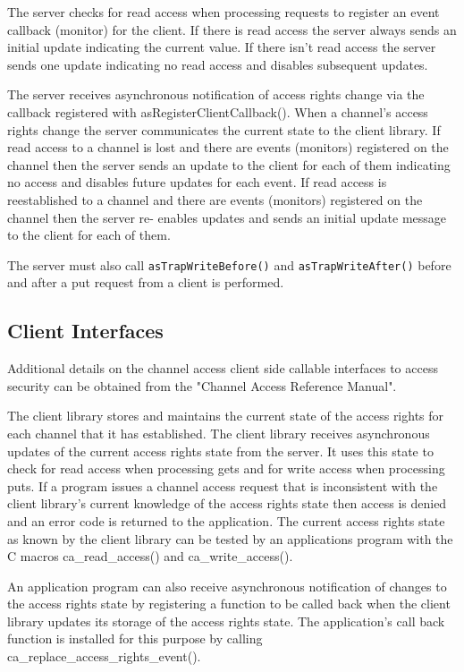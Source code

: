 The server checks for read access when processing requests to register an event callback (monitor) for the client. If there 
is read access the server always sends an initial update indicating the current value. If there isn't read access the server 
sends one update indicating no read access and disables subsequent updates.

The server receives asynchronous notification of access rights change via the callback registered with 
asRegisterClientCallback(). When a channel's access rights change the server communicates the current state 
to the client library. If read access to a channel is lost and there are events (monitors) registered on the channel then the 
server sends an update to the client for each of them indicating no access and disables future updates for each event. If 
read access is reestablished to a channel and there are events (monitors) registered on the channel then the server re-
enables updates and sends an initial update message to the client for each of them.

The server must also call \verb|asTrapWriteBefore()| and \verb|asTrapWriteAfter()| before and after a put request from a 
client is performed.

\subsection{Client Interfaces}

Additional details on the channel access client side callable interfaces to access security can be obtained from the 
"Channel Access Reference Manual".

The client library stores and maintains the current state of the access rights for each channel that it has established. The 
client library receives asynchronous updates of the current access rights state from the server. It uses this state to check for 
read access when processing gets and for write access when processing puts. If a program issues a channel access request 
that is inconsistent with the client library's current knowledge of the access rights state then access is denied and an error 
code is returned to the application. The current access rights state as known by the client library can be tested by an 
applications program with the C macros ca\_read\_access() and ca\_write\_access().

An application program can also receive asynchronous notification of changes to the access rights state by registering a 
function to be called back when the client library updates its storage of the access rights state. The application's call back 
function is installed for this purpose by calling ca\_replace\_access\_rights\_event().

